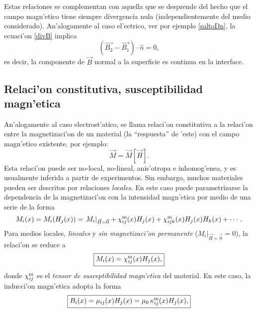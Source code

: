 Estas relaciones se complementan con aquella que se desprende del hecho que el campo magn'etico tiene siempre divergencia nula (independientemente del medio considerado). An'alogamente al caso el'ectrico, ver por ejemplo \eqref{saltoDn}, la ecuaci'on \eqref{divB} implica 
\begin{equation}\label{saltoBn}
\boxed{\left(\vec{B_2}-\vec{B_1}\right)\cdot\hat{n}=0,}
\end{equation}
es decir, la componente de $\vec{B}$ normal a la superficie es continua en la interface.

\subsection{Relaci'on constitutiva, susceptibilidad magn'etica}
An'alogamente al caso electrost'atico, se llama relaci'on constitutiva a la
relaci'on entre la magnetizaci'on de un material (la ``respuesta'' de 'este)
con el campo magn'etico existente, por ejemplo:
\begin{equation}
 \vec{M}=\vec{M}[\vec{H}].
\end{equation}
Esta relaci'on puede ser no-local, no-lineal, anis'otropa e inhomog'enea, y es usualmente inferida a partir de experimentos. Sin
embargo, muchos materiales pueden ser descritos por relaciones \textit{locales}. En
este caso puede parametrizarse la dependencia de la magnetizaci'on con la
intensidad magn'etica por medio de una serie de la forma
\begin{equation}
M_i(x)=M_i(H_j(x))=\left.M_i\right|_{\vec{H}=\vec{0}}
+\chi^{\rm m}_{ij}(x)H_j(x)+\chi^{\rm m}_{ijk}(x)H_j(x)H_k(x)+\cdots.
\end{equation}
Para medios locales, \textit{lineales} y \textit{sin magnetizaci'on permanente}
($\left.M_i\right|_{\vec{H}=\vec{0}}=0$), la relaci'on se reduce a
\begin{equation}
 \boxed{M_i(x)=\chi^{\rm m}_{ij}(x)H_j(x),}
\end{equation}
donde $\chi^{\rm m}_{ij}$ es el \textit{tensor de susceptibilidad magn'etica} del
material. En este caso, la inducci'on magn'etica adopta la forma
\begin{equation}
 \boxed{B_i(x)=\mu_{ij}(x)H_j(x)=\mu_0\,\kappa^{\rm m}_{ij}(x)H_j(x),}
\end{equation}
